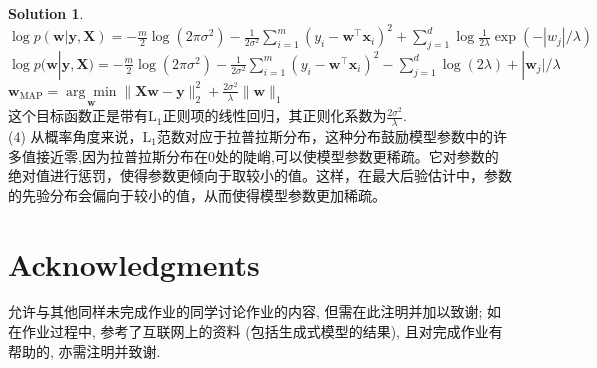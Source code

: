 \documentclass[a4paper,UTF8]{article}
\numberwithin{equation}{section}
\theoremstyle{definition}
\newtheorem*{solution}{Solution}
\def \X {\mathbf{X}}
\def \y {\boldsymbol{y}}
\def \x {\boldsymbol{x}}
\newcommand{\vct}[1]{\boldsymbol{#1}} %
\newcommand{\vw}{\vct{w}}
\begin{document}
\begin{solution}
$\log p(\vw|\y,\X) = -\frac{m}{2} \log(2\pi\sigma^2) - \frac{1}{2\sigma^2} \sum_{i=1}^{m} (y_i - \vw^{\top}\x_i)^2 + \sum_{j=1}^{d} \log \frac{1}{2\lambda} \exp(-|w_j|/\lambda)$\\
$\log p(\vw|\y,\X) = -\frac{m}{2} \log(2\pi\sigma^2) - \frac{1}{2\sigma^2} \sum_{i=1}^{m} (y_i - \vw^{\top}\x_i)^2 - \sum_{j=1}^{d} \log(2\lambda) + |\vw_j|/\lambda$\\
$\vw_{\text{MAP}} = \underset{\vw}{\arg\min} \|\X\vw - \y\|_2^2 + \frac{2\sigma^2}{\lambda} \|\vw\|_1$\\
这个目标函数正是带有$\mathrm{L}_{1}$正则项的线性回归，其正则化系数为$\frac{2 \sigma^2}{\lambda}$.\\
(4) 从概率角度来说，$\mathrm{L}_{1}$范数对应于拉普拉斯分布，这种分布鼓励模型参数中的许多值接近零,因为拉普拉斯分布在0处的陡峭,可以使模型参数更稀疏。它对参数的绝对值进行惩罚，使得参数更倾向于取较小的值。这样，在最大后验估计中，参数的先验分布会偏向于较小的值，从而使得模型参数更加稀疏。
\end{solution}

\newpage
\section*{Acknowledgments}
允许与其他同样未完成作业的同学讨论作业的内容, 但需在此注明并加以致谢; 如在作业过程中, 参考了互联网上的资料 (包括生成式模型的结果), 且对完成作业有帮助的, 亦需注明并致谢.
\end{document}
